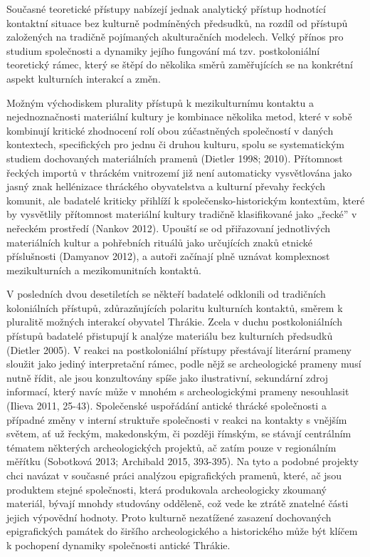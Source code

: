 Současné teoretické přístupy nabízejí jednak analytický přístup hodnotící kontaktní situace bez kulturně podmíněných předsudků, na rozdíl od přístupů založených na tradičně pojímaných akulturačních modelech. Velký přínos pro studium společnosti a dynamiky jejího fungování má tzv. postkoloniální teoretický rámec, který se štěpí do několika směrů zaměřujících se na konkrétní aspekt kulturních interakcí a změn.

Možným východiskem plurality přístupů k mezikulturnímu kontaktu a nejednoznačnosti materiální kultury je kombinace několika metod, které v sobě kombinují kritické zhodnocení rolí obou zúčastněných společností v daných kontextech, specifických pro jednu či druhou kulturu, spolu se systematickým studiem dochovaných materiálních pramenů (Dietler 1998; 2010). Přítomnost řeckých importů v thráckém vnitrozemí již není automaticky vysvětlována jako jasný znak hellénizace thráckého obyvatelstva a kulturní převahy řeckých komunit, ale badatelé kriticky přihlíží k společensko-historickým kontextům, které by vysvětlily přítomnost materiální kultury tradičně klasifikované jako „řecké” v neřeckém prostředí (Nankov 2012). Upouští se od přiřazovaní jednotlivých materiálních kultur a pohřebních rituálů jako určujících znaků etnické příslušnosti (Damyanov 2012), a autoři začínají plně uznávat komplexnost mezikulturních a mezikomunitních kontaktů.

V posledních dvou desetiletích se někteří badatelé odklonili od tradičních koloniálních přístupů, zdůrazňujících polaritu kulturních kontaktů, směrem k pluralitě možných interakcí obyvatel Thrákie. Zcela v duchu postkoloniálních přístupů badatelé přistupují k analýze materiálu bez kulturních předsudků (Dietler 2005). V reakci na postkoloniální přístupy přestávají literární prameny sloužit jako jediný interpretační rámec, podle nějž se archeologické prameny musí nutně řídit, ale jsou konzultovány spíše jako ilustrativní, sekundární zdroj informací, který navíc může v mnohém s archeologickými prameny nesouhlasit (Ilieva 2011, 25-43). Společenské uspořádání antické thrácké společnosti a případné změny v interní struktuře společnosti v reakci na kontakty s vnějším světem, ať už řeckým, makedonským, či později římským, se stávají centrálním tématem některých archeologických projektů, ač zatím pouze v regionálním měřítku (Sobotková 2013; Archibald 2015, 393-395). Na tyto a podobné projekty chci navázat v současné práci analýzou epigrafických pramenů, které, ač jsou produktem stejné společnosti, která produkovala archeologicky zkoumaný materiál, bývají mnohdy studovány odděleně, což vede ke ztrátě znatelné části jejich výpovědní hodnoty. Proto kulturně nezatížené zasazení dochovaných epigrafických památek do širšího archeologického a historického může být klíčem k pochopení dynamiky společnosti antické Thrákie.

